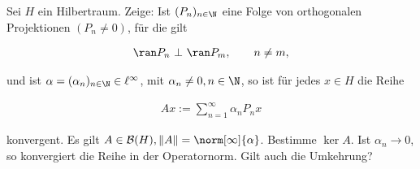 \begin{exercise}

Sei $H$ ein Hilbertraum.
Zeige:
Ist $(P_n)_{n \in \N}$ eine Folge von orthogonalen Projektionen $(P_n \neq 0)$, für die gilt

\begin{align*}
  \ran P_n ~\bot~ \ran P_m, \qquad n \neq m,
\end{align*}

und ist $\alpha = (\alpha_n)_{n \in \N} \in \ell^{\infty}$, mit $\alpha_n \neq 0, n \in \N$, so ist für jedes $x \in H$ die Reihe

\begin{align*}
  Ax := \sum_{n=1}^\infty \alpha_n P_n x
\end{align*}

konvergent.
Es gilt $A \in \mathcal{B}(H), \|A\| = \norm[\infty]{\alpha}$.
Bestimme $\ker A$. Ist $\alpha_n \to 0$, so konvergiert die Reihe in der Operatornorm.
Gilt auch die Umkehrung?

\end{exercise}

